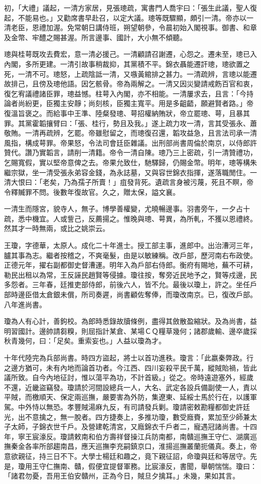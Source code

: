 \begin{pinyinscope}
初，「大禮」議起，一清方家居，見張璁疏，寓書門人喬宇曰：「張生此議，聖人復起，不能易也。」又勸席書早赴召，以定大議。璁等既驟顯，頗引一清。帝亦以一清老臣，恩禮加渥。免常朝日講侍班，朔望朝參，令晨初始入閣視事。御書、和章及金幣、牢醴之賜甚渥。所言邊事、國計，大小無不傾聽。

璁與桂萼既攻去費宏，意一清必援己。一清顧請召謝遷，心怨之。遷未至，璁已入內閣，多所更建。一清引故事稍裁抑，其黨積不平。錦衣聶能遷訐璁，璁欲置之死，一清不可。璁怒，上疏陰詆一清，又嗾黃綰排之甚力。一清疏辨，言璁以能遷故排己，且傍及璁他語。因乞骸骨。帝為兩解之。一清又因災變請戒飭百官和衷，復乞宥議禮諸臣罪，璁益憾。柱萼入內閣，亦不相能。一清屢求去，且言：「今持論者尚紛更，臣獨主安靜；尚刻核，臣獨主寬平。用是多齟齬，願避賢者路。」帝復溫旨褒之。而給事中王準、陸粲發璁、萼招權納賄狀，帝立罷璁、萼，且暴其罪。其黨霍韜攘臂曰：「張、桂行，勢且及我。」遂上疏力攻一清，言其受張永、蕭敬賄。一清再疏辨，乞罷。帝雖慰留之，而璁復召還，韜攻益急，且言法司承一清風指，構成萼罪。帝果怒，令法司會廷臣雜議。出刑部尚書周倫於南京，以侍郎許贊代。讚乃實韜言，請削一清籍。帝令一清自陳。璁乃三上密疏，引一清贊禮功，乞賜寬假，實以堅帝意俾之去。帝果允致仕，馳驛歸，仍賜金幣。明年，璁等構朱繼宗獄，坐一清受張永弟容金錢，為永誌墓，又與容世錦衣指揮，遂落職閒住。一清大恨曰：「老矣，乃為孺子所賣！」疽發背死。遺疏言身被污蔑，死且不瞑，帝令釋贓罪不問。後數年復故官。久之，贈太保，謚文襄。

一清生而隱宮，貌寺人，無子。博學善權變，尤曉暢邊事。羽書旁午，一夕占十疏，悉中機宜。人或訾己，反薦揚之。惟晚與璁、萼異，為所軋，不獲以恩禮終。然其才一時無兩，或比之姚崇云。

王瓊，字德華，太原人。成化二十年進士。授工部主事，進郎中。出治漕河三年，臚其事為志。繼者按稽之，不爽毫髮，由是以敏練稱。改戶部，歷河南右布政使。正德元年，擢右副都御史督漕運。明年入為戶部右侍郎。衡府有賜地，蕪不可耕，勒民出租以為常，王反誣民趙賢等侵據。瓊往按，奪旁近民地予之，賢等戍邊，民多怨者。三年春，廷推吏部侍郎，前後六人，皆不允。最後以瓊上，許之。坐任戶部時邊臣借太倉銀未償，所司奏遲，尚書顧佐奪俸，而瓊改南京。已，復改戶部。八年進尚書。

瓊為人有心計，善鉤校。為郎時悉錄故牘條例，盡得其斂散盈縮狀。及為尚書，益明習國計。邊帥請芻糗，則屈指計某倉、某場ＣＱ糧草幾何；諸郡歲輸、邊卒歲採秋青幾何，曰：「足矣。重索妄也。」人益以瓊為才。

十年代陸完為兵部尚書。時四方盜起，將士以首功進秩。瓊言：「此嬴秦弊政。行之邊方猶可，未有內地而論首功者。今江西、四川妄殺平民千萬，縱賊貽禍，皆此議所致。自今內地征討，惟以蕩平為功，不計首級。」從之。帝時遠遊塞外，經歲不還，近畿盜竊發。瓊請於河間設總兵一人，大名、武定各設兵備副使一人，責以平賊，而檄順天、保定兩巡撫，嚴要害為外防，集遼東、延綏士馬於行在，以護軍駕。中外恃以無恐。孝豐賊湯麻九反，有司請發兵剿。瓊請密敕勘糧都御史許廷光，出不意擒之，無一脫者。四方捷奏上，多推功瓊，數受廕賚，累加至少師兼太子太師，子錦衣世千戶。及營建乾清宮，又廕錦衣千戶者二，寵遇冠諸尚書。十四年，寧王宸濠反。瓊請敕南和伯方壽祥督操江兵防南都，南贛巡撫王守仁、湖廣巡撫秦金各率所部趨南昌，應天巡撫李充嗣鎮京口，淮揚巡撫叢蘭扼儀真。奏上，帝意欲親征，持三日不下。大學士楊廷和趣之，竟下親征詔，命瓊與廷和等居守。先是，瓊用王守仁撫南、贛，假便宜提督軍務。比宸濠反，書聞，舉朝惴惴。瓊曰：「諸君勿憂，吾用王伯安贛州，正為今日，賊旦夕擒耳。」未幾，果如其言。


\end{pinyinscope}
